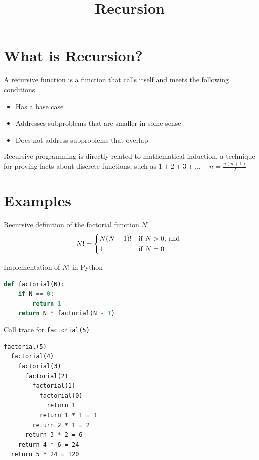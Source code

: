 \documentclass[8pt,a4paper,compress]{beamer}
\title{Recursion}
\date{}
\begin{document}
\begin{frame}
\vfill
\titlepage
\end{frame}

\section{What is Recursion?}
\begin{frame}[fragile]
\pause

A recursive function is a function that calls itself and meets the following conditions
\begin{itemize}
\pause
\item Has a base case
\pause
\item Addresses subproblems that are smaller in some sense
\pause
\item Does not address subproblems that overlap
\end{itemize}

\pause
\bigskip

Recursive programming is directly related to mathematical induction, a technique for proving facts about discrete functions, such as $1 + 2 + 3 + \dots + n = \frac{n(n+1)}{2}$
\end{frame}

\section{Examples}
\begin{frame}[fragile]
\pause

Recursive definition of the factorial function $N!$ 
\[
N! = \begin{dcases*}
N(N-1)! & if $N > 0$, and \\
1       & if $N=0$
\end{dcases*}
\]

\pause
\bigskip

Implementation of $N!$ in Python

\begin{lstlisting}[language=Python,style=focusin]
def factorial(N):
    if N == 0:
        return 1
    return N * factorial(N - 1)
\end{lstlisting}

\pause
\bigskip

Call trace for \lstinline{factorial(5)}
\begin{lstlisting}[language={},style=focusin]
factorial(5)
  factorial(4)
    factorial(3)
      factorial(2)
        factorial(1)
          factorial(0)
            return 1
          return 1 * 1 = 1            
        return 2 * 1 = 2
      return 3 * 2 = 6
    return 4 * 6 = 24
  return 5 * 24 = 120
\end{lstlisting}
\end{frame}
\end{document}

